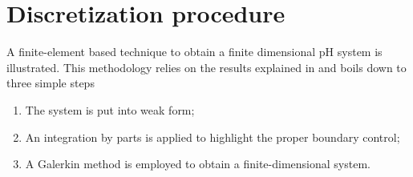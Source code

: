 \documentclass{svjour3}                     %
\begin{document}
\section{Discretization procedure}
\label{sec:discr}
A finite-element based technique to obtain a finite dimensional pH system is illustrated. This methodology relies on the results explained in \cite{cardoso2019partitioned} and boils down to three simple steps
\begin{enumerate}
	\item The system is put into weak form; 
	\item An integration by parts is applied to highlight the proper boundary control;
	\item A Galerkin method is employed to obtain a finite-dimensional system.
\end{enumerate}
\end{document}
